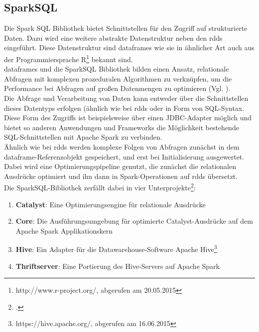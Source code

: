 \subsection{SparkSQL}
Die Spark SQL Bibliothek bietet Schnittstellen für den Zugriff auf strukturierte Daten. Dazu wird eine weitere abstrakte Datenstruktur neben den \glspl{rdd} eingeführt. Diese Datenstruktur sind \glspl{dataframe} wie sie in ähnlicher Art auch aus der Programmiersprache R\footnote{http://www.r-project.org/, abgerufen am 20.05.2015} bekannt sind.\\

\Glspl{dataframe} und die SparkSQL Bibliothek bilden einen Ansatz, relationale Abfragen mit komplexen prozeduralen Algorithmen zu verknüpfen, um die Performance bei Abfragen auf großen Datenmengen zu optimieren (Vgl. \cite{Armbrust:2015:SSR:2723372.2742797}).\\

Die Abfrage und Verarbeitung von Daten kann entweder über die Schnittstellen dieses Datentyps erfolgen (ähnlich wie bei \glspl{rdd} oder in Form von SQL-Syntax.\\

Diese Form des Zugriffs ist beispielsweise über einen JDBC-Adapter möglich und bietet so anderen Anwendungen und Frameworks die Möglichkeit bestehende SQL-Schnittstellen mit Apache Spark zu verbinden.\\

Ähnlich wie bei \glspl{rdd} werden komplexe Folgen von Abfragen zunächst in dem \gls{dataframe}-Referenzobjekt gespeichert, und erst bei Initialisierung ausgewertet. Dabei wird eine Optimierungspipeline genutzt, die zunächst die relationalen Ausdrücke optimiert und ihn dann in Spark-Operationen auf \glspl{rdd} übersetzt.\\

Die SparkSQL-Bibliothek zerfällt dabei in vier Unterprojekte\footcite{https://github.com/apache/spark/tree/branch-1.3/sql, abgerufen am 16.06.2015}:
\begin{enumerate}
	\item \textbf{Catalyst}: Eine Optimierungsengine für relationale Ausdrücke
	\item \textbf{Core}: Die Ausführungsumgebung für optimierte Catalyst-Ausdrücke auf dem Apache Spark Applikationskern
	\item \textbf{Hive}: Ein Adapter für die Datawarehouse-Software Apache Hive\footnote{https://hive.apache.org/, abgerufen am 16.06.2015}
	\item \textbf{Thriftserver}: Eine Portierung des Hive-Servers auf Apache Spark
\end{enumerate}

